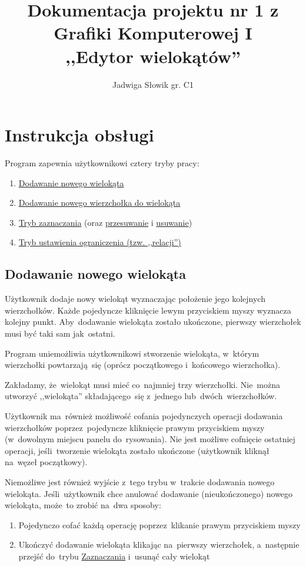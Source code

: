 \documentclass[11pt, a4paper]{article}
\title{Dokumentacja projektu nr 1 z Grafiki Komputerowej I  \\
      ,,Edytor wielokątów''}
\author{Jadwiga Słowik gr. C1}
\begin{document}
 \maketitle
 \section{Instrukcja obsługi}
 Program zapewnia użytkownikowi cztery tryby pracy:
 \begin{enumerate}
  \item \hyperlink{AddNewPolygon}{Dodawanie nowego wielokąta}
  \item \hyperlink{AddNewVertex}{Dodawanie nowego wierzchołka do wielokąta}
  \item \hyperlink{Select}{Tryb zaznaczania} (oraz \hyperlink{Move}{przesuwanie} i \hyperlink{Delete}{usuwanie})
  \item \hyperlink{Relation}{Tryb ustawienia ograniczenia (tzw. ,,relacji'')}
    
 \end{enumerate}
 
 \hypertarget{AddNewPolygon}{\subsection{Dodawanie nowego wielokąta}}
 Użytkownik dodaje nowy wielokąt wyznaczając położenie jego kolejnych wierzchołków. Każde pojedyncze kliknięcie
 lewym przyciskiem myszy wyznacza kolejny punkt. Aby~dodawanie wielokąta zostało ukończone, pierwszy wierzchołek musi być
 taki sam jak~ostatni.
 
 Program uniemożliwia użytkownikowi stworzenie wielokąta, w~którym wierzchołki powtarzają~się (oprócz
 początkowego i~końcowego wierzchołka).
 
 Zakładamy, że~wielokąt musi mieć co~najmniej trzy wierzchołki. Nie~można utworzyć ,,wielokąta'' składającego~się
 z~jednego lub~dwóch~wierzchołków.
 
 Użytkownik ma~również możliwość cofania pojedynczych operacji dodawania wierzchołków poprzez~pojedyncze kliknięcie
 prawym przyciskiem myszy (w~dowolnym miejscu panelu do~rysowania).
 Nie jest możliwe cofnięcie ostatniej operacji, jeśli~tworzenie wielokąta zostało ukończone
 (użytkownik kliknął na~węzeł początkowy).
 
 Niemożliwe jest również wyjście z~tego trybu w~trakcie dodawania nowego wielokąta. Jeśli~użytkownik chce anulować dodawanie
 (nieukończonego) nowego wielokąta, może~to zrobić na~dwa sposoby:
 \begin{enumerate}
  \item Pojedynczo cofać każdą operację poprzez~klikanie prawym przyciskiem myszy
  \item Ukończyć dodawanie wielokąta klikając na~pierwszy wierzchołek, a~następnie przejść do~trybu \hyperlink{Select}{Zaznaczania}
      i~usunąć cały wielokąt
 \end{enumerate}
 
\end{document}

